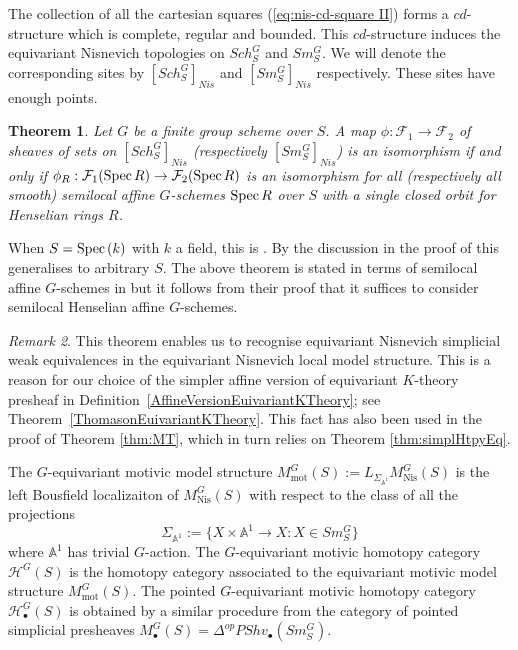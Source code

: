 \documentclass[11pt,twoside]{amsart}
\newtheorem{theorem}{Theorem}[section]
\theoremstyle{definition}
\theoremstyle{remark}
\newtheorem{remark}[theorem]{Remark}
\numberwithin{equation}{section}
\newcommand{\mc}{\mathcal}
\newcommand{\spec}{\mathrm{Spec\hskip .5mm }}
\begin{document}
The collection of all the cartesian squares (\ref{eq:nis-cd-square II}) forms a $cd$-structure which is complete, regular and bounded. This $cd$-structure induces the equivariant Nisnevich topologies on $Sch_S^G$ and $Sm_S^G$. We will denote the corresponding sites by $[Sch^G_S]_{Nis}$ and $[Sm^G_S]_{Nis}$ respectively. These sites have enough points. 
\begin{theorem}
\label{Points}
Let $G$ be a finite group scheme over $S$. A map $\phi: \mc{F}_1\rightarrow \mc{F}_2$ of sheaves of sets on $[Sch^G_S]_{Nis}$  (respectively $[Sm^G_S]_{Nis}$) is an isomorphism if and only if $\phi_R: \mc{F}_1(\spec R)\rightarrow \mc{F}_2(\spec R)$ is an isomorphism for all (respectively all smooth) semilocal affine $G$-schemes $\spec R$ over $S$ with a single closed orbit for Henselian rings $R$. 
\end{theorem}   
When $S=\spec(k)$ with $k$ a field, this is \cite[Theorem~3.14]{HVO}. By the discussion in the proof of \cite[Proposition 2.17]{HKO14} this generalises to arbitrary $S$. The above theorem is stated in terms of semilocal affine $G$-schemes in \cite{HVO} but it follows from their proof that it suffices to consider semilocal Henselian affine $G$-schemes. 
\begin{remark}
This theorem enables us to recognise equivariant Nisnevich simplicial weak equivalences in the equivariant Nisnevich local model structure.  This is a reason for our choice of the simpler affine version of equivariant $K$-theory presheaf in Definition~\ref{AffineVersionEuivariantKTheory}; see Theorem~\ref{ThomasonEuivariantKTheory}. This fact has also been used in the proof of Theorem \ref{thm:MT}, which in turn relies on Theorem \ref{thm:simplHtpyEq}. 
\end{remark}


The $G$-equivariant motivic model structure $M^G_{\mathrm{mot}}(S) := L_{\Sigma_{\mathbb{A}^1}}M^G_{\mathrm{Nis}}(S)$ is the left Bousfield localizaiton of $M^G_{\mathrm{Nis}}(S)$ with respect to the class of all the projections
\[ \Sigma_{\mathbb{A}^1} := \{ X \times \mathbb{A}^1 \rightarrow X: X \in Sm_S^G \}\]
where $\mathbb{A}^1$ has trivial $G$-action.
The $G$-equivariant motivic homotopy category $\mc{H}^G(S)$ is the homotopy category associated to the equivariant motivic model structure $M^G_{\mathrm{mot}}(S)$. The pointed $G$-equivariant motivic homotopy category $\mc{H}^G_\bullet(S)$ is obtained by a similar procedure from the category of pointed simplicial presheaves $M^G_\bullet(S)=\Delta^{op}PShv_\bullet(Sm_S^G)$. 
\end{document}

